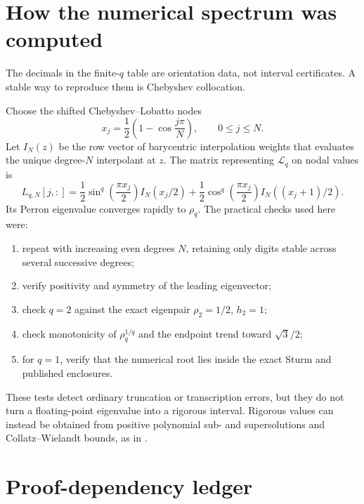 \documentclass[11pt,oneside]{article}
\numberwithin{equation}{section}
\theoremstyle{definition}
\theoremstyle{remark}
\newcommand{\Transfer}{\mathcal L}
\begin{document}
\section{How the numerical spectrum was computed}
\label{app:numerics}

The decimals in the finite-\(q\) table are orientation data, not interval certificates.  A
stable way to reproduce them is Chebyshev collocation.

Choose the shifted Chebyshev--Lobatto nodes
\begin{equation}
 x_j=\frac12\left(1-\cos\frac{j\pi}{N}\right),
 \qquad 0\le j\le N.
 \label{eq:cheb-nodes}
\end{equation}
Let \(I_N(z)\) be the row vector of barycentric interpolation weights that evaluates the
unique degree-\(N\) interpolant at \(z\).  The matrix representing \(\Transfer_q\) on nodal
values is
\begin{equation}
 L_{q,N}[j,:]
 =\frac12\sin^q\!\left(\frac{\pi x_j}{2}\right)I_N(x_j/2)
 +\frac12\cos^q\!\left(\frac{\pi x_j}{2}\right)I_N((x_j+1)/2).
 \label{eq:collocation-matrix}
\end{equation}
Its Perron eigenvalue converges rapidly to \(\rho_q\).  The practical checks used here were:
\begin{enumerate}
\item repeat with increasing even degrees \(N\), retaining only digits stable across several
      successive degrees;
\item verify positivity and symmetry of the leading eigenvector;
\item check \(q=2\) against the exact eigenpair \(\rho_2=1/2\), \(h_2=1\);
\item check monotonicity of \(\rho_q^{1/q}\) and the endpoint trend toward \(\sqrt3/2\);
\item for \(q=1\), verify that the numerical root lies inside the exact Sturm and published
      enclosures.
\end{enumerate}
These tests detect ordinary truncation or transcription errors, but they do not turn a
floating-point eigenvalue into a rigorous interval.  Rigorous values can instead be obtained
from positive polynomial sub- and supersolutions and Collatz--Wielandt bounds, as in
.

\section{Proof-dependency ledger}
\label{app:proof-status}
\end{document}
